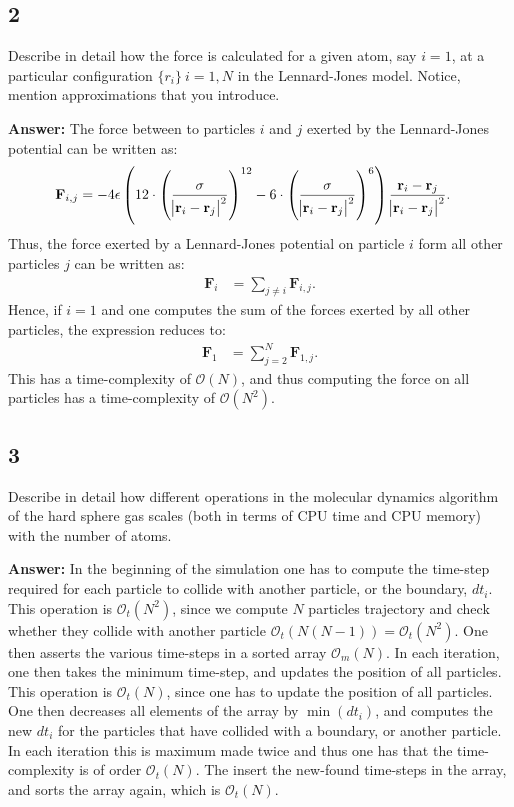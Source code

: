 \documentclass[a4paper]{article}
\newcommand{\newparagraph}{\vspace{.5cm}\noindent}
\begin{document}
\subsection*{2}
Describe in detail how the force is calculated for a given atom, say $i = 1$, at a particular configuration $\{r_i\}~ i = 1,N$ in the Lennard-Jones model. Notice, mention approximations that you introduce. 

\newparagraph
\textbf{Answer:} The force between to particles $i$ and $j$ exerted by the Lennard-Jones potential can be written as:
\begin{align*}
    \mathbf{F}_{i,j} &= -4\epsilon\left(12\cdot\left(\frac{\sigma}{\abs{\mathbf{r}_i - \mathbf{r}_j}^2}\right)^{12} - 6\cdot\left(\frac{\sigma}{\abs{\mathbf{r}_i - \mathbf{r}_j}^2}\right)^{6}\right)\frac{\mathbf{r}_i-\mathbf{r}_j}{\abs{\mathbf{r}_i - \mathbf{r}_j}^2}.
\end{align*}Thus, the force exerted by a Lennard-Jones potential on particle $i$ form all other particles $j$ can be written as:
\begin{align*}
    \mathbf{F}_i &= \sum_{j\neq i}\mathbf{F}_{i,j}.
\end{align*}Hence, if $i = 1$ and one computes the sum of the forces exerted by all other particles, the expression reduces to:
\begin{align*}
    \mathbf{F}_1 &= \sum_{j = 2}^N\mathbf{F}_{1,j}.
\end{align*}This has a time-complexity of $\mathcal{O}(N)$, and thus computing the force on all particles has a time-complexity of $\mathcal{O}(N^2)$.
\subsection*{3}
Describe in detail how different operations in the molecular dynamics algorithm of the hard sphere gas scales (both in terms of CPU time and CPU memory) with the number of atoms.

\newparagraph
\textbf{Answer:} In the beginning of the simulation one has to compute the time-step required for each particle to collide with another particle, or the boundary, $dt_i$. This operation is $\mathcal{O}_t(N^2)$, since we compute $N$ particles trajectory and check whether they collide with another particle $\mathcal{O}_t(N(N - 1)) = \mathcal{O}_t(N^2)$.
One then asserts the various time-steps in a sorted array $\mathcal{O}_m(N)$. In each iteration, one then takes the minimum time-step, and updates the position of all particles. This operation is $\mathcal{O}_t(N)$, since one has to update the position of all particles. One then decreases all elements of the array by $\min(dt_i)$, and computes the new $dt_i$ for the particles that have collided with a boundary, or another particle.
In each iteration this is maximum made twice and thus one has that the time-complexity is of order $\mathcal{O}_t(N)$. The insert the new-found time-steps in the array, and sorts the array again, which is $\mathcal{O}_t(N)$.
\end{document}
